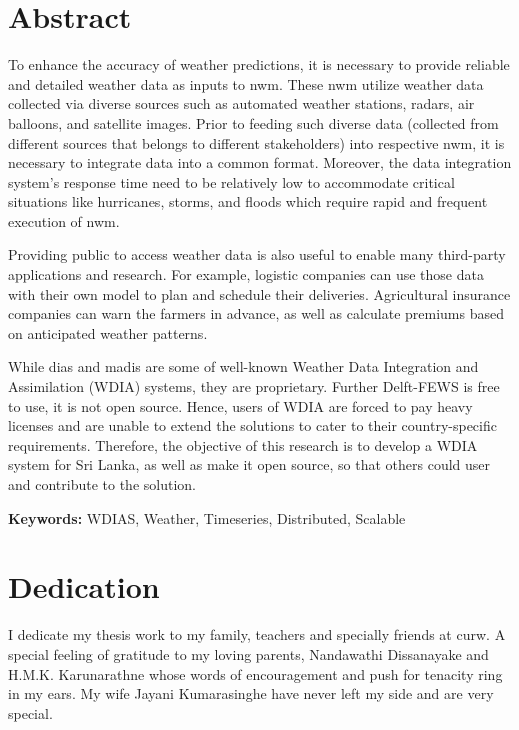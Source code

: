 \documentclass[a4paper,oneside,12pt]{report}
\begin{document}
{ 
\chapter*{Abstract}

To enhance the accuracy of weather predictions, it is necessary to provide reliable and detailed weather data as inputs to \acrfull{nwm}. These \acrshort{nwm} utilize weather data collected via diverse sources such as automated weather stations, radars, air balloons, and satellite images. Prior to feeding such diverse data (collected from different sources that belongs to different stakeholders) into respective \acrshort{nwm}, it is necessary to integrate data into a common format. Moreover, the data integration system’s response time need to be relatively low to accommodate critical situations like hurricanes, storms, and floods which require rapid and frequent execution of \acrshort{nwm}.

Providing public to access weather data is also useful to enable many third-party applications and research. For example, logistic companies can use those data with their own model to plan and schedule their deliveries. Agricultural insurance companies can warn the farmers in advance, as well as calculate premiums based on anticipated weather patterns.

While \acrfull{dias} and \acrfull{madis} are some of well-known Weather Data Integration and Assimilation (WDIA) systems, they are proprietary. Further Delft-FEWS is free to use, it is not open source. Hence, users of WDIA are forced to pay heavy licenses and are unable to extend the solutions to cater to their country-specific requirements. Therefore, the objective of this research is to develop a WDIA system for Sri Lanka, as well as make it open source, so that others could user and contribute to the solution.

\vspace{4mm}

\textbf{Keywords:} WDIAS, Weather, Timeseries, Distributed, Scalable

}
\restoregeometry
\normalsize

\chapter*{Dedication}
I dedicate my thesis work to my family, teachers and specially friends at \acrfull{curw}. A special feeling of gratitude to my loving parents, Nandawathi Dissanayake and H.M.K. Karunarathne whose words of encouragement and push for tenacity ring in my ears. My wife Jayani Kumarasinghe have never left my side and are very special.
\end{document}
